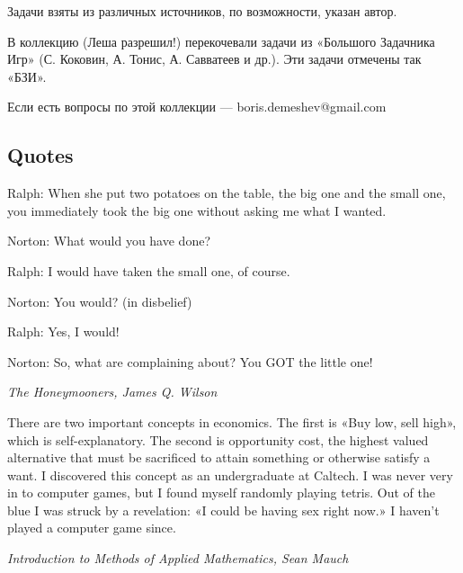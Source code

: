 
Задачи взяты из различных источников, по возможности, указан автор.

В коллекцию (Леша разрешил!) перекочевали задачи из «Большого Задачника Игр» (С. Коковин, А. Тонис, А. Савватеев и др.). Эти задачи отмечены так «БЗИ».

Если есть вопросы по этой коллекции --- boris.demeshev@gmail.com





\subsection{Quotes}

Ralph: When she put two potatoes on the table, the big one and the small one, you immediately took the big one without asking me what I wanted.\par
Norton: What would you have done?\par
Ralph: I would have taken the small one, of course.\par
Norton: You would? (in disbelief)\par
Ralph: Yes, I would!\par
Norton: So, what are complaining about? You GOT the little one!\par
{\it The Honeymooners, James Q. Wilson}\par

There are two important concepts in economics. The first is «Buy low, sell high», which is self-explanatory. The second is opportunity cost, the highest valued alternative that must be sacrificed to attain something or otherwise satisfy a want. I discovered this concept as an undergraduate at Caltech. I was never very in to computer games, but I found myself randomly playing tetris. Out of the blue I was struck by a revelation: «I could be having sex right now.» I haven't played a computer game since.\par
{\it Introduction to Methods of Applied Mathematics, Sean Mauch}\par

